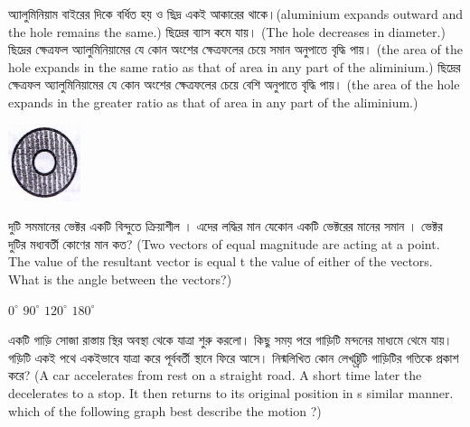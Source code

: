 \documentclass[addpoints]{exam}
\begin{document}
\begin{questions}
\begin{minipage}{0.6\textwidth}\raggedright
\begin{oneparchoices}
\choice অ্যালুমিনিয়াম বাইরের দিকে বর্ধিত হয় ও ছিদ্র একই আকারের থাকে।(aluminium expands outward and the hole remains the same.)
\choice  ছিদ্রের ব্যাস কমে যায়। (The hole decreases in diameter.)
\choice  ছিদ্রের ক্ষেত্রফল অ্যালুমিনিয়ামের যে কোন অংশের ক্ষেত্রফলের চেয়ে সমান অনুপাতে বৃদ্ধি পায়। (the area of the hole expands in the same ratio as that of area in any part of the aliminium.)
\choice ছিদ্রের ক্ষেত্রফল অ্যালুমিনিয়ামের যে কোন অংশের ক্ষেত্রফলের চেয়ে বেশি অনুপাতে বৃদ্ধি পায়। (the area of the hole expands in the greater ratio as that of area in any part of the aliminium.)
\end{oneparchoices}
\end{minipage}
\hfill%
\begin{minipage}{0.3\textwidth}%
\includegraphics{du-al.png}
\end{minipage}%



\question   দুটি সমমানের ভেক্টর একটি বিন্দুতে ক্রিয়াশীল । এদের লদ্ধির মান যেকোন একটি ভেক্টরের মানের সমান । ভেক্টর দুটির মধ্যবর্তী কোণের মান কত? (Two vectors of equal magnitude are acting at a point. The value of the resultant vector is equal t the value of either of the vectors. What is the angle between the vectors?)

\begin{oneparchoices}
\choice $ 0^{\circ} $
\choice $ 90^{\circ} $
\choice $ 120^{\circ} $
\choice $ 180^{\circ} $
\end{oneparchoices}

\question একটি গাড়ি সোজা রাস্তায় স্থির অবস্থা থেকে যাত্রা শুরু করলো। কিছু সময় পরে গাড়িটি মন্দনের মাধ্যমে থেমে যায়। গড়িটি একই পথে একইভাবে যাত্রা করে পূর্ববর্তী স্থানে ফিরে আসে। নিন্মলিখিত কোন লেখচ্ত্রিটি গাড়িটির গতিকে প্রকাশ করে? (A car accelerates from rest on a straight road. A short time later the decelerates to a stop. It then returns to its original position in s similar manner. which of the following graph best describe the motion ?)

\begin{oneparchoices}


\end{oneparchoices}
\end{questions}
\end{document}
